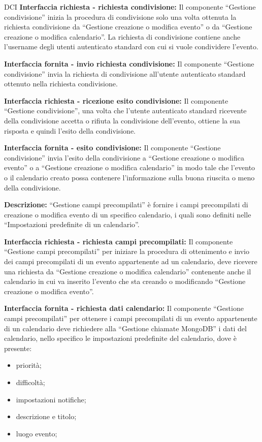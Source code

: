\begin{listaPersonale}{DCI}
    \textbf{Interfaccia richiesta - richiesta condivisione:} Il componente “Gestione condivisione” inizia la procedura di condivisione solo una volta ottenuta la richiesta condivisione da “Gestione creazione o modifica evento” o da “Gestione creazione o modifica calendario”. La richiesta di condivisione contiene anche l'username degli utenti autenticato standard con cui si vuole condividere l'evento.

    \textbf{Interfaccia fornita - invio richiesta condivisione:} Il componente “Gestione condivisione” invia la richiesta di condivisione all'utente autenticato standard ottenuto nella richiesta condivisione.

    \textbf{Interfaccia richiesta - ricezione esito condivisione:} Il componente “Gestione condivisione”, una volta che l'utente autenticato standard ricevente della condivisione accetta o rifiuta la condivisione dell'evento, ottiene la sua risposta e quindi l'esito della condivisione.

    \textbf{Interfaccia fornita - esito condivisione:} Il componente “Gestione condivisione” invia l'esito della condivisione a “Gestione creazione o modifica evento” o a “Gestione creazione o modifica calendario” in modo tale che l'evento o il calendario creato possa contenere l'informazione sulla buona riuscita o meno della condivisione.



    \textbf{Descrizione:}  “Gestione campi precompilati” è fornire i campi precompilati di creazione o modifica evento di un specifico calendario, i quali sono definiti nelle “Impostazioni predefinite di un calendario”.

    \textbf{Interfaccia richiesta - richiesta campi precompilati:} Il componente “Gestione campi precompilati” per iniziare la procedura di ottenimento e invio dei campi precompilati di un evento appartenente ad un calendario, deve ricevere una richiesta da “Gestione creazione o modifica calendario” contenente anche il calendario in cui va inserito l'evento che sta creando o modificando “Gestione creazione o modifica evento”.

    \textbf{Interfaccia fornita - richiesta dati calendario:} Il componente “Gestione campi precompilati” per ottenere i campi precompilati di un evento appartenente di un calendario deve richiedere alla “Gestione chiamate MongoDB” i dati del calendario, nello specifico le impostazioni predefinite del calendario, dove è presente:
    \begin{itemize}
        \item priorità;
        \item difficoltà;
        \item impostazioni notifiche;
        \item descrizione e titolo;
        \item luogo evento;
    \end{itemize}


\end{listaPersonale}
